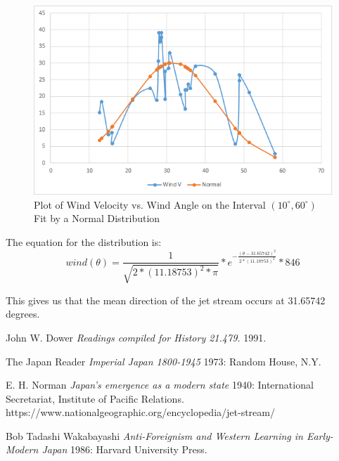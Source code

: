 \documentclass{article}
\begin{document}
\begin{figure}[H]
  \centering
  \includegraphics[width=\textwidth]{alan-data-2.png}
  \caption{Plot of Wind Velocity vs. Wind Angle on the Interval $(10^{\circ}, 60^{\circ})$ Fit by a Normal Distribution}
\end{figure}


The equation for the distribution is:
\[
wind(\theta) = \frac{1}{\sqrt{2*(11.18753)^2*\pi}}*e^{-\frac{(\theta-31.65742)^2}{2*(11.18753)^2}}*846
\]

This gives us that the mean direction of the jet stream occurs at 31.65742 degrees.




\begin{thebibliography}{1}

 John W. Dower {\em Readings compiled for History
21.479.}  1991.

  The Japan Reader {\em Imperial Japan 1800-1945} 1973:
Random House, N.Y.

 E. H. Norman {\em Japan's emergence as a modern
state} 1940: International Secretariat, Institute of Pacific
Relations. https://www.nationalgeographic.org/encyclopedia/jet-stream/

 Bob Tadashi Wakabayashi {\em Anti-Foreignism and Western
Learning in Early-Modern Japan} 1986: Harvard University Press.

\end{thebibliography}



\appendix
\end{document}
